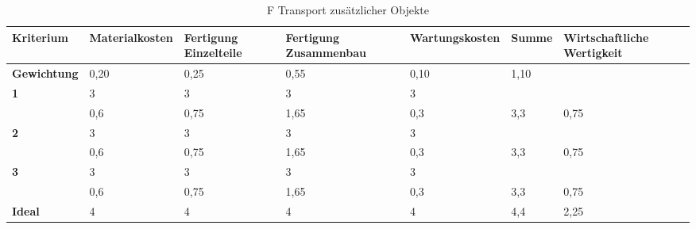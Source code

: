 \documentclass[10pt,a4paper]{article}
\begin{document}
\begin{table}[h!]
    \centering
    \hspace*{0in} %
    \begin{tabular}{>{\bfseries}p{2cm} p{2.2cm} p{2cm} p{2cm} p{2.5cm} p{2cm} p{2cm}}
        \toprule
        Kriterium  & Materialkosten & Fertigung Einzelteile & Fertigung Zusammenbau & Wartungskosten & Summe & Wirtschaftliche Wertigkeit \\
        \midrule
        Gewichtung & 0,20           & 0,25                  & 0,55                  & 0,10           & 1,10  &                            \\
        \midrule
        1          & 3              & 3                     & 3                     & 3              &       &                            \\
                   & 0,6            & 0,75                  & 1,65                  & 0,3            & 3,3   & 0,75                       \\
        \midrule
        2          & 3              & 3                     & 3                     & 3              &       &                            \\
                   & 0,6            & 0,75                  & 1,65                  & 0,3            & 3,3   & 0,75                       \\
        \midrule
        3          & 3              & 3                     & 3                     & 3              &       &                            \\
                   & 0,6            & 0,75                  & 1,65                  & 0,3            & 3,3   & 0,75                       \\
        \midrule
        Ideal      & 4              & 4                     & 4                     & 4              & 4,4   & 2,25                       \\
        \bottomrule
    \end{tabular}
    \caption{F Transport zusätzlicher Objekte}
\end{table}
\end{document}
